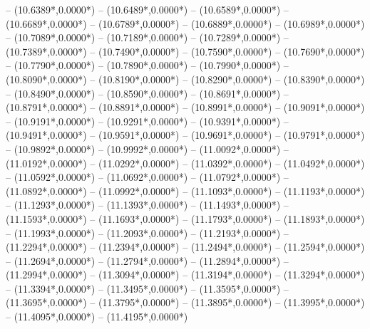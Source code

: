 {	-- ({10.6389*\dx},{0.0000*\dy})
	-- ({10.6489*\dx},{0.0000*\dy})
	-- ({10.6589*\dx},{0.0000*\dy})
	-- ({10.6689*\dx},{0.0000*\dy})
	-- ({10.6789*\dx},{0.0000*\dy})
	-- ({10.6889*\dx},{0.0000*\dy})
	-- ({10.6989*\dx},{0.0000*\dy})
	-- ({10.7089*\dx},{0.0000*\dy})
	-- ({10.7189*\dx},{0.0000*\dy})
	-- ({10.7289*\dx},{0.0000*\dy})
	-- ({10.7389*\dx},{0.0000*\dy})
	-- ({10.7490*\dx},{0.0000*\dy})
	-- ({10.7590*\dx},{0.0000*\dy})
	-- ({10.7690*\dx},{0.0000*\dy})
	-- ({10.7790*\dx},{0.0000*\dy})
	-- ({10.7890*\dx},{0.0000*\dy})
	-- ({10.7990*\dx},{0.0000*\dy})
	-- ({10.8090*\dx},{0.0000*\dy})
	-- ({10.8190*\dx},{0.0000*\dy})
	-- ({10.8290*\dx},{0.0000*\dy})
	-- ({10.8390*\dx},{0.0000*\dy})
	-- ({10.8490*\dx},{0.0000*\dy})
	-- ({10.8590*\dx},{0.0000*\dy})
	-- ({10.8691*\dx},{0.0000*\dy})
	-- ({10.8791*\dx},{0.0000*\dy})
	-- ({10.8891*\dx},{0.0000*\dy})
	-- ({10.8991*\dx},{0.0000*\dy})
	-- ({10.9091*\dx},{0.0000*\dy})
	-- ({10.9191*\dx},{0.0000*\dy})
	-- ({10.9291*\dx},{0.0000*\dy})
	-- ({10.9391*\dx},{0.0000*\dy})
	-- ({10.9491*\dx},{0.0000*\dy})
	-- ({10.9591*\dx},{0.0000*\dy})
	-- ({10.9691*\dx},{0.0000*\dy})
	-- ({10.9791*\dx},{0.0000*\dy})
	-- ({10.9892*\dx},{0.0000*\dy})
	-- ({10.9992*\dx},{0.0000*\dy})
	-- ({11.0092*\dx},{0.0000*\dy})
	-- ({11.0192*\dx},{0.0000*\dy})
	-- ({11.0292*\dx},{0.0000*\dy})
	-- ({11.0392*\dx},{0.0000*\dy})
	-- ({11.0492*\dx},{0.0000*\dy})
	-- ({11.0592*\dx},{0.0000*\dy})
	-- ({11.0692*\dx},{0.0000*\dy})
	-- ({11.0792*\dx},{0.0000*\dy})
	-- ({11.0892*\dx},{0.0000*\dy})
	-- ({11.0992*\dx},{0.0000*\dy})
	-- ({11.1093*\dx},{0.0000*\dy})
	-- ({11.1193*\dx},{0.0000*\dy})
	-- ({11.1293*\dx},{0.0000*\dy})
	-- ({11.1393*\dx},{0.0000*\dy})
	-- ({11.1493*\dx},{0.0000*\dy})
	-- ({11.1593*\dx},{0.0000*\dy})
	-- ({11.1693*\dx},{0.0000*\dy})
	-- ({11.1793*\dx},{0.0000*\dy})
	-- ({11.1893*\dx},{0.0000*\dy})
	-- ({11.1993*\dx},{0.0000*\dy})
	-- ({11.2093*\dx},{0.0000*\dy})
	-- ({11.2193*\dx},{0.0000*\dy})
	-- ({11.2294*\dx},{0.0000*\dy})
	-- ({11.2394*\dx},{0.0000*\dy})
	-- ({11.2494*\dx},{0.0000*\dy})
	-- ({11.2594*\dx},{0.0000*\dy})
	-- ({11.2694*\dx},{0.0000*\dy})
	-- ({11.2794*\dx},{0.0000*\dy})
	-- ({11.2894*\dx},{0.0000*\dy})
	-- ({11.2994*\dx},{0.0000*\dy})
	-- ({11.3094*\dx},{0.0000*\dy})
	-- ({11.3194*\dx},{0.0000*\dy})
	-- ({11.3294*\dx},{0.0000*\dy})
	-- ({11.3394*\dx},{0.0000*\dy})
	-- ({11.3495*\dx},{0.0000*\dy})
	-- ({11.3595*\dx},{0.0000*\dy})
	-- ({11.3695*\dx},{0.0000*\dy})
	-- ({11.3795*\dx},{0.0000*\dy})
	-- ({11.3895*\dx},{0.0000*\dy})
	-- ({11.3995*\dx},{0.0000*\dy})
	-- ({11.4095*\dx},{0.0000*\dy})
	-- ({11.4195*\dx},{0.0000*\dy})
}
